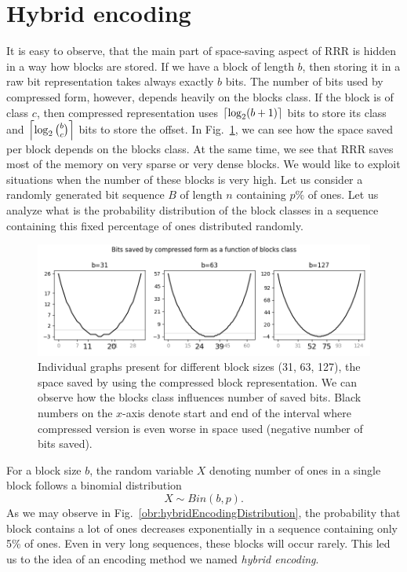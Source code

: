 \section{Hybrid encoding}


It is easy to observe, that the main part of space-saving aspect of RRR is hidden in
a way how blocks are stored. If we have a block of length $b$, then storing it in
a raw bit representation takes always exactly $b$ bits. The number of bits used by
compressed form, however, depends heavily on the blocks class. If the block is of class
$c$, then compressed representation uses $\left\lceil \log_2 (b+1) \right\rceil$ bits to store its
class and $\left\lceil \log_2{b\choose c} \right\rceil$ bits to store the offset. In Fig.~\ref{obr:rrrSpaceSavings},
we can see how the space saved per block depends on the blocks class. At the same
time, we see that RRR saves most of the memory on very sparse or very dense blocks.
We would like to exploit situations when the number of these blocks is very high.
Let us consider a randomly generated bit sequence $B$ of length $n$ containing
$p\%$ of ones. Let us analyze what is the probability distribution of the block
classes in a sequence containing this fixed percentage of ones distributed randomly.
\begin{figure}
	\centerline{
		\includegraphics[width=\textwidth]{images/rrr_space_savings}
	}
	\caption[TODO]{Individual graphs present for different block sizes (31, 63, 127), 
    the space saved by using the compressed block representation. We can observe how
    the blocks class influences number of saved bits. Black numbers on the $x$-axis
    denote start and end of the interval where compressed version is even worse
    in space used (negative number of bits saved).
	}
	\label{obr:rrrSpaceSavings}
\end{figure}
For a block size $b$, the random variable $X$ denoting number of ones in a single
block follows a binomial distribution $$X \sim Bin(b, p).$$ As we may observe in
Fig.~\ref{obr:hybridEncodingDistribution}, the probability that block contains
a lot of ones decreases exponentially in a sequence containing only 5\% of ones.
Even in very long sequences, these blocks will occur rarely. This led us to the
idea of an encoding method we named \textit{hybrid encoding}.

